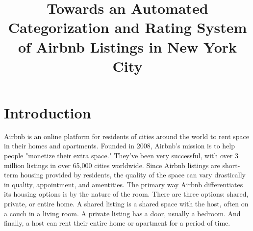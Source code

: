 \documentclass[conference]{IEEEtran}
\begin{document}
%
\title{Towards an Automated Categorization and Rating System of Airbnb Listings in New York City}


\author{
}



\maketitle

\begin{abstract}

\end{abstract}

\section{Introduction}
\IEEEPARstart
Airbnb is an online platform for residents of cities around the world to rent space in their homes and apartments.
Founded in 2008, Airbnb's mission is to help people "monetize their extra space." They've
been very successful, with over 3 million listings in over 65,000 cities worldwide.\cite{airbnb_about_us}
Since Airbnb listings are short-term housing provided by residents, the quality of the space
can vary drastically in quality, appointment, and amentities. The primary way Airbnb differentiates
its housing options is by the nature of the room. There are three options: shared, private, or entire home. A shared listing
is a shared space with the host, often on a couch in a living room. A private listing has
a door, usually a bedroom. And finally, a host can rent their entire home or apartment for a period of time.
\end{document}
